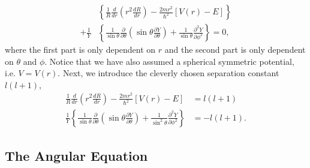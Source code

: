 \begin{equation}
    \begin{aligned}
        &
        \left\{ 
            \frac{1}{R}\frac{d}{dr}
                \left(r^2\frac{dR}{dr} \right)
            -
            \frac{2mr^2}{\hbar^2}
                \left[V(r) - E \right]
        \right\}
        \\ + \frac{1}{Y} &
        \left\{
            \frac{1}{\sin\theta }\frac{\partial}{\partial\theta}
                \left(\sin\theta \frac{\partial Y}{\partial\theta} \right)
            +
            \frac{1}{\sin\theta}\frac{\partial^2Y}{\partial\phi^2}
        \right\}
        = 0,
    \end{aligned}
\end{equation}
where the first part is only dependent on $r$ and the second part is only
dependent on $\theta$ and $\phi$. Notice that we have also assumed a spherical 
symmetric potential, i.e. $V=V(r)$. Next, we introduce the cleverly chosen 
separation constant $l(l + 1)$,
\begin{align}
    \label{eq:the_radial_equation}
    \frac{1}{R}\frac{d}{dr}
        \left(r^2\frac{dR}{dr}\right)
    -
    \frac{2mr^2}{\hbar^2}\left[V(r) - E \right] 
    &= l (l + 1) \\
    \label{eq:the_angular_equation}
    \frac{1}{Y}\left\{ 
        \frac{1}{\sin\theta}\frac{\partial}{\partial\theta}
            \left(\sin\theta \frac{\partial Y}{\partial\theta} \right)
        +
        \frac{1}{\sin^2\theta}\frac{\partial^2 Y}{\partial \phi^2}
    \right\} 
    &= - l (l + 1).
\end{align}

\subsection{The Angular Equation}

